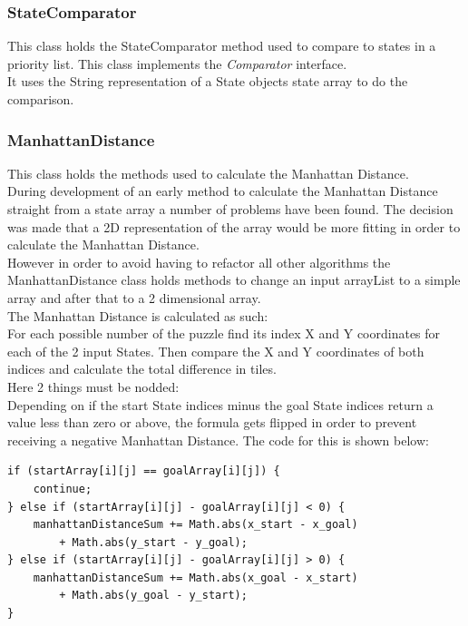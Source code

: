 \documentclass[journal]{IEEEtran}
\begin{document}
\subsubsection{StateComparator}
This class holds the StateComparator method used to compare to states in a priority list. This class implements the \textit{Comparator} interface. \\
It uses the String representation of a State objects state array to do the comparison. \\

\subsubsection{ManhattanDistance}
This class holds the methods used to calculate the Manhattan Distance. \\
During development of an early method to calculate the Manhattan Distance straight from a state array a number of problems have been found. The decision was made that a 2D representation of the array would be more fitting in order to calculate the Manhattan Distance. \\
However in order to avoid having to refactor all other algorithms the ManhattanDistance class holds methods to change an input arrayList to a simple array and after that to a 2 dimensional array. \\

The Manhattan Distance is calculated as such:\\
For each possible number of the puzzle find its index X and Y coordinates for each of the 2 input States. Then compare the X and Y coordinates of both indices and calculate the total difference in tiles. \\

Here 2 things must be nodded:\\
Depending on if the start State indices minus the goal State indices return a value less than zero or above, the formula gets flipped in order to prevent receiving a negative Manhattan Distance. The code for this is shown below:\\
\begin{lstlisting}
if (startArray[i][j] == goalArray[i][j]) {
	continue;
} else if (startArray[i][j] - goalArray[i][j] < 0) {
	manhattanDistanceSum += Math.abs(x_start - x_goal)
		+ Math.abs(y_start - y_goal);
} else if (startArray[i][j] - goalArray[i][j] > 0) {
	manhattanDistanceSum += Math.abs(x_goal - x_start)
		+ Math.abs(y_goal - y_start);
}
\end{lstlisting}
\end{document}
